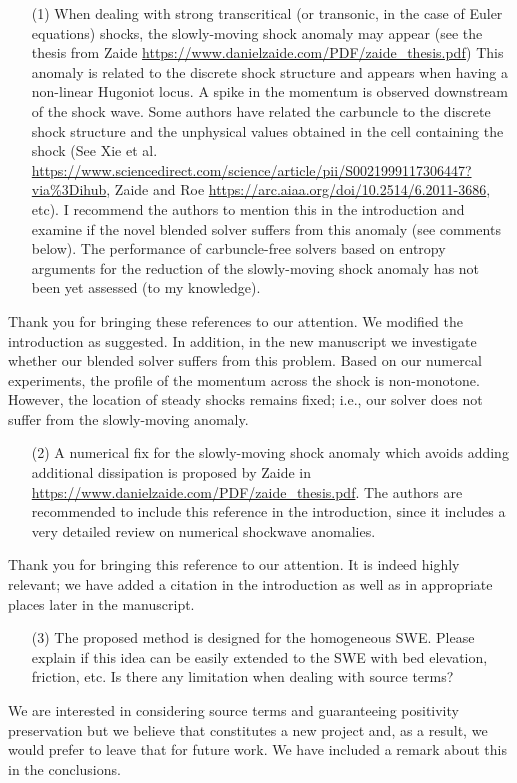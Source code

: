 \documentclass[english,11pt]{article}
\begin{document}
\bigskip
{\color{OliveGreen}
  \begin{itemize}
  \item[(1)]
    When dealing with strong transcritical (or transonic, in the case of Euler equations) shocks, 
    the slowly-moving shock anomaly may appear 
    (see the thesis from Zaide \url{https://www.danielzaide.com/PDF/zaide_thesis.pdf})
    This anomaly is related to the discrete shock structure and appears when having a non-linear Hugoniot locus. 
    A spike in the momentum is observed downstream of the shock wave. Some authors have related the carbuncle to 
    the discrete shock structure and the unphysical values obtained in the cell containing the shock 
    (See Xie et al. \url{https://www.sciencedirect.com/science/article/pii/S0021999117306447?via\%3Dihub},
    Zaide and Roe \url{https://arc.aiaa.org/doi/10.2514/6.2011-3686}, etc). I recommend the authors to mention 
    this in the introduction and examine if the novel blended solver suffers from this anomaly (see comments below). 
    The performance of carbuncle-free solvers based on entropy arguments for the reduction of the slowly-moving 
    shock anomaly has not been yet assessed (to my knowledge).
  \end{itemize}
}
\noindent
Thank you for bringing these references to our attention.
We modified the introduction as suggested. In addition, in the new manuscript we investigate 
whether our blended solver suffers from this problem. 
Based on our numercal experiments, the profile of the momentum across the shock is non-monotone.
However, the location of steady shocks remains fixed; i.e., our solver does not suffer from 
the slowly-moving anomaly. 

\bigskip
{\color{OliveGreen}
  \begin{itemize}
  \item[(2)]
    A numerical fix for the slowly-moving shock anomaly which avoids adding additional dissipation is proposed 
    by Zaide in \url{https://www.danielzaide.com/PDF/zaide_thesis.pdf}.
    The authors are recommended to include this reference in the introduction, 
    since it includes a very detailed review on numerical shockwave anomalies.
  \end{itemize}
}
\noindent
Thank you for bringing this reference to our attention.  It is indeed highly relevant; we have
added a citation in the introduction as well as in appropriate places later in the manuscript.

\bigskip
{\color{OliveGreen}
  \begin{itemize}
  \item[(3)]
    The proposed method is designed for the homogeneous SWE. 
    Please explain if this idea can be easily extended to the SWE with bed elevation, friction, etc. 
    Is there any limitation when dealing with source terms?
  \end{itemize}
}
\noindent
We are interested in considering source terms and guaranteeing positivity preservation but 
we believe that constitutes a new project and, as a result, we would prefer to leave that 
for future work. We have included a remark about this in the conclusions. 
      
\end{document}
